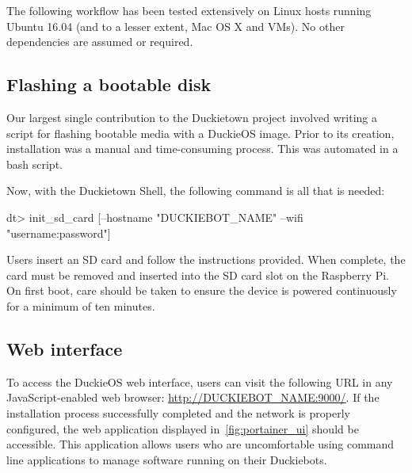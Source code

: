 \documentclass[12pt,initial,twoside,maitrise]{dms}
\numberwithin{equation}{section}
\numberwithin{table}{chapter}
\numberwithin{figure}{chapter}
\begin{document}
\noindent The following workflow has been tested extensively on Linux hosts running Ubuntu 16.04 (and to a lesser extent, Mac OS X and VMs). No other dependencies are assumed or required.

\subsection{Flashing a bootable disk}

Our largest single contribution to the Duckietown project involved writing a script for flashing bootable media with a DuckieOS image. Prior to its creation, installation was a manual and time-consuming process. This was automated in a bash script.

%
Now, with the Duckietown Shell, the following command is all that is needed:
%
\begin{dtslisting}
dt> init_sd_card [--hostname "DUCKIEBOT_NAME" --wifi "username:password"]
\end{dtslisting}
%
Users insert an SD card and follow the instructions provided. When complete, the card must be removed and inserted into the SD card slot on the Raspberry Pi. On first boot, care should be taken to ensure the device is powered continuously for a minimum of ten minutes.

\subsection{Web interface}

To access the DuckieOS web interface, users can visit the following URL in any JavaScript-enabled web browser: \url{http://DUCKIEBOT_NAME:9000/}. If the installation process successfully completed and the network is properly configured, the web application displayed in~\autoref{fig:portainer_ui} should be accessible. This application allows users who are uncomfortable using command line applications to manage software running on their Duckiebots.
\end{document}
